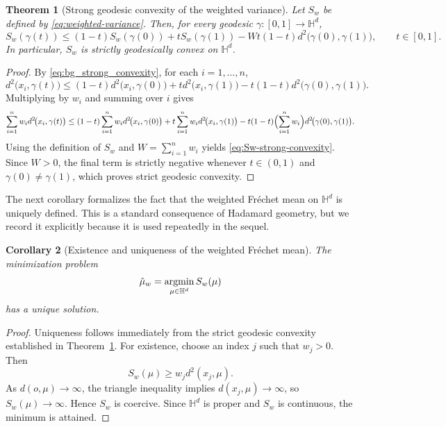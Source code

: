 \documentclass[11pt]{article}
\newtheorem{theorem}{Theorem}[section]
\newtheorem{corollary}[theorem]{Corollary}
\begin{document}
\begin{theorem}[Strong geodesic convexity of the weighted variance]\label{thm:Sw-strong-convexity}
Let \(S_w\) be defined by \eqref{eq:weighted-variance}. Then, for every geodesic \(\gamma:[0,1]\to\mathbb{H}^d\),
\begin{equation}\label{eq:Sw-strong-convexity}
S_w(\gamma(t))
\le
(1-t)S_w(\gamma(0))
+tS_w(\gamma(1))
-Wt(1-t)d^2\bigl(\gamma(0),\gamma(1)\bigr),
\qquad t\in[0,1].
\end{equation}
In particular, \(S_w\) is strictly geodesically convex on \(\mathbb{H}^d\).
\end{theorem}

\begin{proof}
By \eqref{eq:bg_strong_convexity}, for each \(i=1,\ldots,n\),
\[
d^2\!\bigl(x_i,\gamma(t)\bigr)
\le
(1-t)d^2\!\bigl(x_i,\gamma(0)\bigr)
+t d^2\!\bigl(x_i,\gamma(1)\bigr)
-t(1-t)d^2\!\bigl(\gamma(0),\gamma(1)\bigr).
\]
Multiplying by \(w_i\) and summing over \(i\) gives
\[
\sum_{i=1}^n w_i d^2\!\bigl(x_i,\gamma(t)\bigr)
\le
(1-t)\sum_{i=1}^n w_i d^2\!\bigl(x_i,\gamma(0)\bigr)
+t\sum_{i=1}^n w_i d^2\!\bigl(x_i,\gamma(1)\bigr)
-t(1-t)\Bigl(\sum_{i=1}^n w_i\Bigr)d^2\!\bigl(\gamma(0),\gamma(1)\bigr).
\]
Using the definition of \(S_w\) and \(W=\sum_{i=1}^n w_i\) yields \eqref{eq:Sw-strong-convexity}. Since \(W>0\), the final term is strictly negative whenever \(t\in(0,1)\) and \(\gamma(0)\neq \gamma(1)\), which proves strict geodesic convexity.
\end{proof}

The next corollary formalizes the fact that the weighted Fr\'echet mean on \(\mathbb{H}^d\) is uniquely defined. This is a standard consequence of Hadamard geometry, but we record it explicitly because it is used repeatedly in the sequel.

\begin{corollary}[Existence and uniqueness of the weighted Fr\'echet mean]\label{cor:weighted-frechet-exists-unique}
The minimization problem
\begin{equation}\label{eq:weighted-frechet-problem}
\hat{\mu}_w
=
\operatorname*{argmin}_{\mu\in\mathbb{H}^d} S_w(\mu)
\end{equation}
has a unique solution.
\end{corollary}

\begin{proof}
Uniqueness follows immediately from the strict geodesic convexity established in Theorem~\ref{thm:Sw-strong-convexity}. For existence, choose an index \(j\) such that \(w_j>0\). Then
\[
S_w(\mu)\ge w_j d^2(x_j,\mu).
\]
As \(d(o,\mu)\to\infty\), the triangle inequality implies \(d(x_j,\mu)\to\infty\), so \(S_w(\mu)\to\infty\). Hence \(S_w\) is coercive. Since \(\mathbb{H}^d\) is proper and \(S_w\) is continuous, the minimum is attained.
\end{proof}
\end{document}
